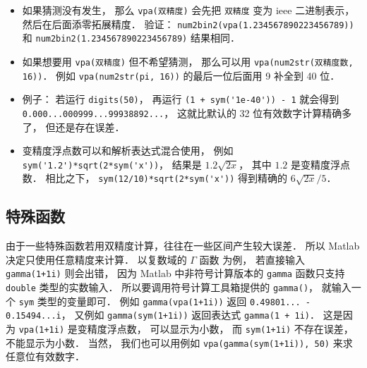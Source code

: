 \begin{itemize}
\item 如果猜测没有发生， 那么 \verb|vpa(双精度)| 会先把 \verb|双精度| 变为 ieee 二进制表示， 然后在后面添零拓展精度． 验证： \verb|num2bin2(vpa(1.234567890223456789))| 和 \verb|num2bin2(1.234567890223456789)| 结果相同．

\item 如果想要用 \verb|vpa(双精度)| 但不希望猜测， 那么可以用 \verb|vpa(num2str(双精度数, 16))|． 例如 \verb|vpa(num2str(pi, 16))| 的最后一位后面用 9 补全到 40 位．

\item 例子： 若运行 \verb|digits(50)|， 再运行 \verb|(1 + sym('1e-40')) - 1| 就会得到 \verb|0.000...000999...99938892...|， 这就比默认的 32 位有效数字计算精确多了， 但还是存在误差．

\item 变精度浮点数可以和解析表达式混合使用， 例如 \verb|sym('1.2')*sqrt(2*sym('x'))|， 结果是 $1.2 \sqrt{2x}$， 其中 $1.2$ 是变精度浮点数． 相比之下， \verb|sym(12/10)*sqrt(2*sym('x'))| 得到精确的 $6\sqrt{2x}/5$．
\end{itemize}

\subsection{特殊函数}
由于一些特殊函数若用双精度计算，往往在一些区间产生较大误差． 所以 Matlab 决定只使用任意精度来计算． 以复数域的 $\Gamma$ 函数 为例， 若直接输入 \verb|gamma(1+1i)| 则会出错， 因为 Matlab 中非符号计算版本的 \verb|gamma| 函数只支持 \verb|double| 类型的实数输入． 所以要调用符号计算工具箱提供的 \verb|gamma()|， 就输入一个 \verb|sym| 类型的变量即可． 例如 \verb|gamma(vpa(1+1i))| 返回 \verb|0.49801... - 0.15494...i|， 又例如 \verb|gamma(sym(1+1i))| 返回表达式 \verb|gamma(1 + 1i)|． 这是因为 \verb|vpa(1+1i)| 是变精度浮点数， 可以显示为小数， 而 \verb|sym(1+1i)| 不存在误差， 不能显示为小数． 当然， 我们也可以用例如 \verb|vpa(gamma(sym(1+1i)), 50)| 来求任意位有效数字．
